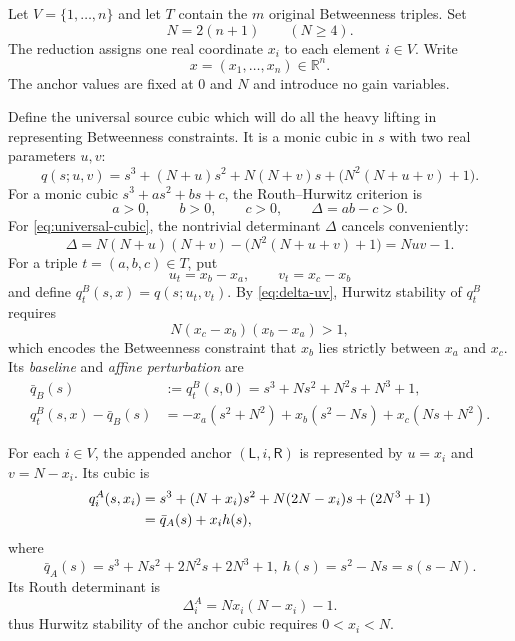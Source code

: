 \documentclass[final,5p,times,twocolumn]{elsarticle}
\newcommand{\R}{\mathbb R}
\begin{document}
Let $V=\{1,\ldots,n\}$ and let $T$ contain the $m$ original Betweenness triples. Set
\begin{equation}\label{eq:N}
N=2(n+1)\qquad(N\ge4).
\end{equation}
The reduction assigns one real coordinate $x_i$ to each element $i\in V$. Write
\[
x=(x_1,\ldots,x_n)\in\R^n.
\]
The anchor values are fixed at $0$ and $N$ and introduce no gain variables.

Define the universal source cubic which will do all the heavy lifting in representing Betweenness constraints. It is a monic cubic in $s$ with two real parameters $u,v$:
\begin{equation}\label{eq:universal-cubic}
q(s;u,v)
=s^3+(N+u)s^2+N(N+v)s+\bigl(N^2(N+u+v)+1\bigr).
\end{equation}
For a monic cubic $s^3+as^2+bs+c$, the Routh--Hurwitz criterion is
\[
a>0,\qquad b>0,\qquad c>0,\qquad \Delta = ab-c>0.
\]
For \eqref{eq:universal-cubic}, the nontrivial determinant $\Delta$ cancels conveniently:
\begin{equation}\label{eq:delta-uv}
\Delta=N(N+u)(N+v)-\bigl(N^2(N+u+v)+1\bigr)=Nuv-1.
\end{equation}
For a triple $t=(a,b,c)\in T$, put
\begin{equation}\label{eq:uv-triple}
u_t=x_b-x_a,\qquad v_t=x_c-x_b
\end{equation}
and define $q_t^B(s,x)=q(s;u_t,v_t)$. By \eqref{eq:delta-uv}, Hurwitz stability of $q_t^B$ requires
\[
N(x_c-x_b)(x_b-x_a)>1,
\]
which encodes the Betweenness constraint that $x_b$ lies strictly between $x_a$ and $x_c$. Its \emph{baseline} and \emph{affine perturbation} are
\begin{align}
\bar q_B(s)&:=q_t^B(s,0)=s^3+Ns^2+N^2s+N^3+1,\label{eq:qB0}\\
q_t^B(s,x)-\bar q_B(s)
&=-x_a(s^2+N^2)+x_b(s^2-Ns)+x_c(Ns+N^2).\label{eq:triple-pert}
\end{align}

For each $i\in V$, the appended anchor $(\mathsf L,i,\mathsf R)$ is represented by $u=x_i$ and $v=N-x_i$. Its cubic is
\begin{align}
q_i^A(s,x_i)
&=s^3+(N+x_i)s^2+N(2N-x_i)s+(2N^3+1)\notag\\
&=\bar q_A(s)+x_i h(s),\label{eq:qA}
\end{align}
where
\begin{equation}\label{eq:qA0-h}
\bar q_A(s)=s^3+Ns^2+2N^2s+2N^3+1,~ h(s)=s^2-Ns=s(s-N).
\end{equation}
Its Routh determinant is
\begin{equation}\label{eq:anchor-delta}
\Delta_i^A=Nx_i(N-x_i)-1.
\end{equation}
thus Hurwitz stability of the anchor cubic requires $0<x_i<N$. 
\end{document}
